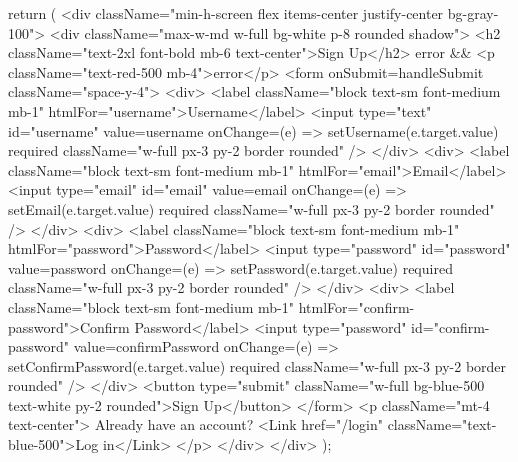 {    return (
        <div className="min-h-screen flex items-center justify-center bg-gray-100">
            <div className="max-w-md w-full bg-white p-8 rounded shadow">
                <h2 className="text-2xl font-bold mb-6 text-center">Sign Up</h2>
                {error && <p className="text-red-500 mb-4">{error}</p>}
                <form onSubmit={handleSubmit} className="space-y-4">
                    <div>
                        <label className="block text-sm font-medium mb-1" htmlFor="username">Username</label>
                        <input
                            type="text"
                            id="username"
                            value={username}
                            onChange={(e) => setUsername(e.target.value)}
                            required
                            className="w-full px-3 py-2 border rounded"
                        />
                    </div>
                    <div>
                        <label className="block text-sm font-medium mb-1" htmlFor="email">Email</label>
                        <input
                            type="email"
                            id="email"
                            value={email}
                            onChange={(e) => setEmail(e.target.value)}
                            required
                            className="w-full px-3 py-2 border rounded"
                        />
                    </div>
                    <div>
                        <label className="block text-sm font-medium mb-1" htmlFor="password">Password</label>
                        <input
                            type="password"
                            id="password"
                            value={password}
                            onChange={(e) => setPassword(e.target.value)}
                            required
                            className="w-full px-3 py-2 border rounded"
                        />
                    </div>
                    <div>
                        <label className="block text-sm font-medium mb-1" htmlFor="confirm-password">Confirm Password</label>
                        <input
                            type="password"
                            id="confirm-password"
                            value={confirmPassword}
                            onChange={(e) => setConfirmPassword(e.target.value)}
                            required
                            className="w-full px-3 py-2 border rounded"
                        />
                    </div>
                    <button type="submit" className="w-full bg-blue-500 text-white py-2 rounded">Sign Up</button>
                </form>
                <p className="mt-4 text-center">
                    Already have an account? <Link href="/login" className="text-blue-500">Log in</Link>
                </p>
            </div>
        </div>
    );
}


